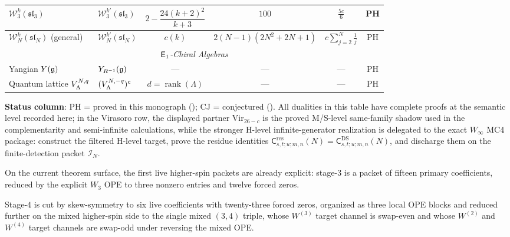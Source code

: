 \begin{table}[ht]
{{\begin{tabular}{|l|l|c|c|c|c|}
\hline
$\mathcal{W}_3^k(\mathfrak{sl}_3)$
  & $\mathcal{W}_3^{k'}(\mathfrak{sl}_3)$
  & $2 - \dfrac{24(k{+}2)^2}{k{+}3}$ & $100$ & $\tfrac{5c}{6}$ & PH \\[4pt]
\hline
$\mathcal{W}_N^k(\mathfrak{sl}_N)$ (general)
  & $\mathcal{W}_N^{k'}(\mathfrak{sl}_N)$
  & $c(k)$ & $2(N{-}1)(2N^2{+}2N{+}1)$
  & $c \displaystyle\sum_{j=2}^{N}\tfrac{1}{j}$ & PH \\[6pt]
\hline
\multicolumn{6}{|c|}{\textit{$\mathsf{E}_1$-Chiral Algebras}} \\
\hline
Yangian $Y(\mathfrak{g})$
  & $Y_{R^{-1}}(\mathfrak{g})$
  & --- & --- & --- & PH \\
\hline
Quantum lattice $V_\Lambda^{N,q}$
  & $(V_\Lambda^{N,-q})^c$
  & $d = \operatorname{rank}(\Lambda)$ & ---
  & --- & PH \\
\hline
\end{tabular}%
}%
}%
\end{table}

\noindent\textbf{Status column}: PH = proved in this monograph
(\ClaimStatusProvedHere); CJ = conjectured (\ClaimStatusConjectured).
All dualities in this table have complete proofs at the semantic level
recorded here; in the Virasoro row, the displayed partner
$\mathrm{Vir}_{26-c}$ is the proved M/S-level same-family shadow used in
the complementarity and semi-infinite calculations, while the stronger
H-level infinite-generator realization is delegated to the exact
$W_\infty$ MC4 package: construct the filtered H-level target, prove
the residue identities
$\mathsf{C}^{\mathrm{res}}_{s,t;u;m,n}(N)
=\mathsf{C}^{\mathrm{DS}}_{s,t;u;m,n}(N)$,
and discharge them on the finite-detection packet $\mathcal{I}_N$.

On the current theorem surface, the first live higher-spin packets are
already explicit: stage-$3$ is a packet of fifteen primary
coefficients, reduced by the explicit $W_3$ OPE to three nonzero
entries and twelve forced zeros.

Stage-$4$ is cut by skew-symmetry to six live coefficients with
twenty-three forced zeros, organized as three local OPE blocks and
reduced further on the mixed higher-spin side to the single mixed
$(3,4)$ triple, whose $W^{(3)}$ target channel is swap-even and whose
$W^{(2)}$ and $W^{(4)}$ target channels are swap-odd under reversing
the mixed OPE.

